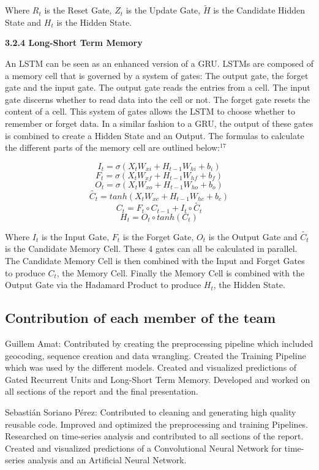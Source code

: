 \documentclass{article}
\begin{document}
Where $R_{t}$ is the Reset Gate, $Z_{t}$ is the Update Gate, $\tilde{H}$ is the Candidate Hidden State and $H_{t}$ is the Hidden State.

\textbf{3.2.4 Long-Short Term Memory}

An LSTM can be seen as an enhanced version of a GRU. LSTMs are composed of a memory cell that is governed by a system of gates: The output gate, the forget gate and the input gate. The output gate reads the entries from a cell. The input gate discerns whether to read data into the cell or not. The forget gate resets the content of a cell. This system of gates allows the LSTM to choose whether to remember or forget data. In a similar fashion to a GRU, the output of these gates is combined to create a Hidden State and an Output. The formulas to calculate the different parts of the memory cell are outlined below:$^{17}$

$$I_{t} = \sigma(X_{t}W_{xi} + H_{t-1}W_{hi} + b_{i})$$
$$F_{t} = \sigma(X_{t}W_{xf} + H_{t-1}W_{hf} + b_{f})$$
$$O_{t} = \sigma(X_{t}W_{xo} + H_{t-1}W_{ho} + b_{o})$$
$$\tilde{C_{t}} = tanh(X_{t}W_{xc} + H_{t-1}W_{hc} + b_{c})$$
$$C_{t} = F_{t} \circ C_{t-1} + I_{t} \circ \tilde{C_{t}}$$
$$H_{t} = O_{t} \circ tanh(C_{t})$$

Where $I_{t}$ is the Input Gate, $F_{t}$ is the Forget Gate, $O_{t}$ is the Output Gate and $\tilde{C_{t}}$ is the Candidate Memory Cell. These 4 gates can all be calculated in parallel. The Candidate Memory Cell is then combined with the Input and Forget Gates to produce $C_{t}$, the Memory Cell. Finally the Memory Cell is combined with the Output Gate via the Hadamard Product to produce $H_{t}$, the Hidden State.

\subsection{Contribution of each member of the team}
Guillem Amat: Contributed by creating the preprocessing pipeline which included geocoding, sequence creation and data wrangling. Created the Training Pipeline which was used by the different models. Created and visualized predictions of Gated Recurrent Units and Long-Short Term Memory. Developed and worked on all sections of the report and the final presentation.

Sebastián Soriano Pérez: Contributed to cleaning and generating high quality reusable code. Improved and optimized the preprocessing and training Pipelines. Researched on time-series analysis and contributed to all sections of the report. Created and visualized predictions of a Convolutional Neural Network for time-series analysis and an Artificial Neural Network.
\end{document}
